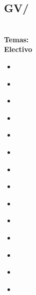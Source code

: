 \subsection{GV/\GVBasicRendering}\label{sec:BOK:GVBasicRendering}
\GVBasicRenderingDescription\\
\noindent \textbf{Temas:}\\
\noindent \textbf{Electivo}
\begin{itemize}
	\item \GVBasicRenderingTopicRendering\label{sec:BOK:GVBasicRenderingTopicRendering}
	\item \GVBasicRenderingTopicForward\label{sec:BOK:GVBasicRenderingTopicForward}
	\item \GVBasicRenderingTopicPolygonal\label{sec:BOK:GVBasicRenderingTopicPolygonal}
	\item \GVBasicRenderingTopicBasic\label{sec:BOK:GVBasicRenderingTopicBasic}
	\item \GVBasicRenderingTopicAffine\label{sec:BOK:GVBasicRenderingTopicAffine}
	\item \GVBasicRenderingTopicRay\label{sec:BOK:GVBasicRenderingTopicRay}
	\item \GVBasicRenderingTopicVisibility\label{sec:BOK:GVBasicRenderingTopicVisibility}
	\item \GVBasicRenderingTopicThe\label{sec:BOK:GVBasicRenderingTopicThe}
	\item \GVBasicRenderingTopicSimple\label{sec:BOK:GVBasicRenderingTopicSimple}
	\item \GVBasicRenderingTopicRenderingWith\label{sec:BOK:GVBasicRenderingTopicRenderingWith}
	\item \GVBasicRenderingTopicTexture\label{sec:BOK:GVBasicRenderingTopicTexture}
	\item \GVBasicRenderingTopicApplication\label{sec:BOK:GVBasicRenderingTopicApplication}
	\item \GVBasicRenderingTopicSampling\label{sec:BOK:GVBasicRenderingTopicSampling}
	\item \GVBasicRenderingTopicScene\label{sec:BOK:GVBasicRenderingTopicScene}
\end{itemize}


